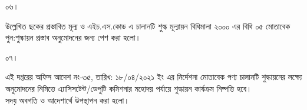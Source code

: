 \documentclass[12pt]{article}
\begin{document}
\begin{minipage}[t]{0.05\linewidth}
০৬।
\end{minipage}
\begin{minipage}[t]{0.95\linewidth}
উল্লেখিত ছকের প্রস্তাবিত মূল্য ও এইচ.এস.কোড
এ চালানটি শুল্ক মূল্যায়ন বিধিমালা ২০০০ এর
বিধি ০৫ মোতাবেক পুন:শুল্কায়ন প্রস্তাব অনুমোদনের
জন্য পেশ করা হলো।
\\
\end{minipage}
\begin{minipage}[t]{0.05\linewidth}
০৭।
\end{minipage}
\begin{minipage}[t]{0.95\linewidth}
এই দপ্তরের অফিস আদেশ নং-৩৫,
তারিখ: ১৮/০৪/২০২১ ইং এর
নির্দেশনা মোতাবেক পণ্য চালানটি শুল্কায়নের
লক্ষ্যে অনুমোদনের নিমিত্তে এ্যাসিসটেন্ট/ডেপুটি কমিশনার
মহোদয় পর্যায়ে শুল্কায়ন কার্যক্রম নিষ্পত্তি হবে।
\\
সদয় অবগতি ও আদেশার্থে উপস্থাপন করা হলো।

\end{minipage}

\thispagestyle{laststyle}
\end{document}
